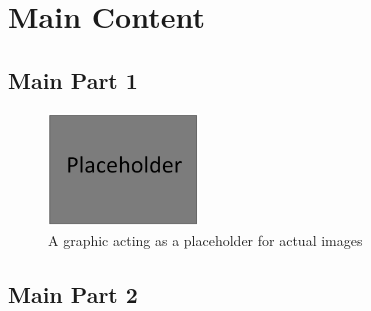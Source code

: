 
\chapter{Main Content}\label{ch:main}

\section{Main Part 1}\label{sec:main-part-1}
\Blindtext[8]
\cite{googleSearch2024}

\begin{figure}[H]
    \centering
    \includegraphics[height=3cm]{figures/placeholder.jpg}
    \caption[Placeholder graphics]{A graphic acting as a placeholder for actual images}
    \label{fig:placeholder}
\end{figure}

\section{Main Part 2}\label{sec:main-part-2}
\Blindtext[13]
\cite{googleSearch2024}
